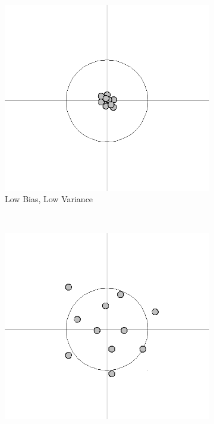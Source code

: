 			\begin{figure}
				\centering
				\begin{subfigure}{0.3\linewidth}
					\centering
					\includegraphics[width=\linewidth]{figures/low-bias-low-variance}
					\caption{Low Bias, Low Variance}
				\end{subfigure}
				~
				\begin{subfigure}{0.3\linewidth}
					\centering
					\includegraphics[width=\linewidth]{figures/low-bias-high-variance}

\end{subfigure}
\end{figure}
